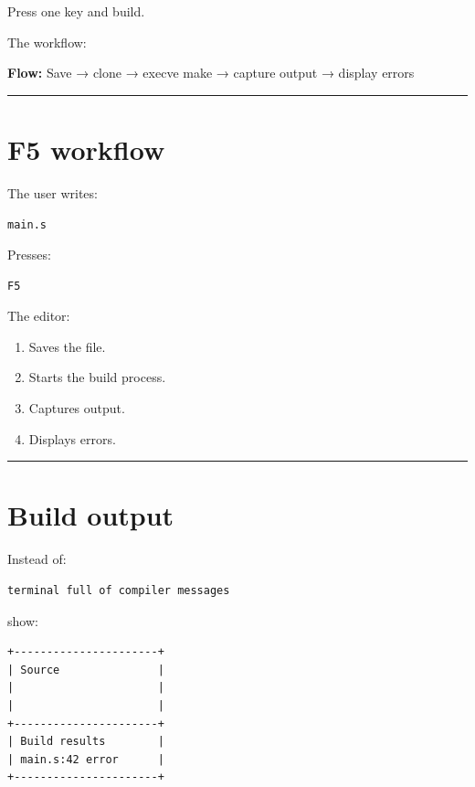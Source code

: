 \documentclass[
  oneside,
  openany]{book}
\providecommand{\tightlist}{%
  \setlength{\itemsep}{0pt}\setlength{\parskip}{0pt}}
\begin{document}
Press one key and build.

The workflow:

\textbf{Flow:} Save → clone → execve make → capture output → display
errors

\begin{center}\rule{0.5\linewidth}{0.5pt}\end{center}

\hypertarget{f5-workflow}{%
\section{F5 workflow}\label{f5-workflow}}

The user writes:

\begin{verbatim}
main.s
\end{verbatim}

Presses:

\begin{verbatim}
F5
\end{verbatim}

The editor:

\begin{enumerate}
\def\labelenumi{\arabic{enumi}.}
\tightlist
\item
  Saves the file.
\item
  Starts the build process.
\item
  Captures output.
\item
  Displays errors.
\end{enumerate}

\begin{center}\rule{0.5\linewidth}{0.5pt}\end{center}

\hypertarget{build-output-1}{%
\section{Build output}\label{build-output-1}}

Instead of:

\begin{verbatim}
terminal full of compiler messages
\end{verbatim}

show:

\begin{verbatim}
+----------------------+
| Source               |
|                      |
|                      |
+----------------------+
| Build results        |
| main.s:42 error      |
+----------------------+
\end{verbatim}
\end{document}
